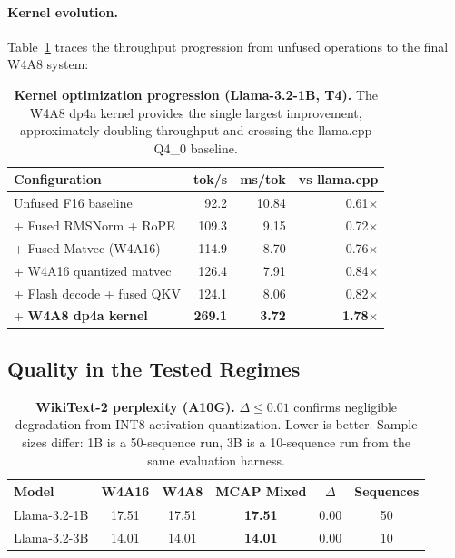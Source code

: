 \documentclass{article}
\begin{document}
\paragraph{Kernel evolution.} Table~\ref{tab:kernel_evolution} traces the throughput
progression from unfused operations to the final W4A8 system:

\begin{table}[H]
\centering
\caption{\textbf{Kernel optimization progression (Llama-3.2-1B, T4).} The
W4A8 dp4a kernel provides the single largest improvement, approximately
doubling throughput and crossing the llama.cpp Q4\_0 baseline.}
\label{tab:kernel_evolution}
\small
\begin{tabular}{lrrr}
\toprule
Configuration & tok/s & ms/tok & vs llama.cpp \\
\midrule
Unfused F16 baseline & 92.2 & 10.84 & 0.61$\times$ \\
+ Fused RMSNorm + RoPE & 109.3 & 9.15 & 0.72$\times$ \\
+ Fused Matvec (W4A16) & 114.9 & 8.70 & 0.76$\times$ \\
+ W4A16 quantized matvec & 126.4 & 7.91 & 0.84$\times$ \\
+ Flash decode + fused QKV & 124.1 & 8.06 & 0.82$\times$ \\
\rowcolor{w4a8color!15}
+ \textbf{W4A8 dp4a kernel} & \textbf{269.1} & \textbf{3.72} & \textbf{1.78$\times$} \\
\bottomrule
\end{tabular}
\end{table}


\subsection{Quality in the Tested Regimes}
\label{sec:quality}

\begin{table}[H]
\centering
\caption{\textbf{WikiText-2 perplexity (A10G).} $\Delta \leq 0.01$ confirms negligible
degradation from INT8 activation quantization. Lower is better. Sample sizes differ: 1B
is a 50-sequence run, 3B is a 10-sequence run from the same evaluation harness.}
\label{tab:wikitext}
\small
\begin{tabular}{lccccc}
\toprule
Model & W4A16 & W4A8 & MCAP Mixed & $\Delta$ & Sequences \\
\midrule
Llama-3.2-1B & 17.51 & 17.51 & \textbf{17.51} & 0.00 & 50 \\
Llama-3.2-3B & 14.01 & 14.01 & \textbf{14.01} & 0.00 & 10 \\
\bottomrule
\end{tabular}
\end{table}
\end{document}
